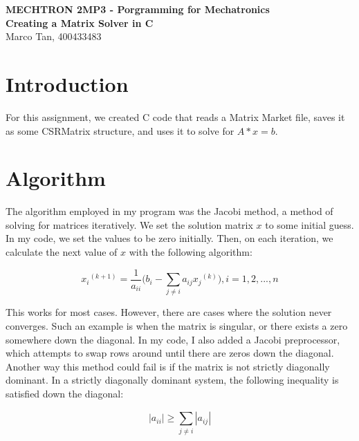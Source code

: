 \documentclass[12pt]{article}
\begin{document}
	
	\justifying
	
	\begin{center}
		\textbf{{\large MECHTRON 2MP3 - Porgramming for Mechatronics}} \\
		\textbf{Creating a Matrix Solver in C} \\
		Marco Tan, 400433483
	\end{center}
	
	\section{Introduction}
    For this assignment, we created C code that reads a Matrix Market file, saves it as some CSRMatrix structure, and uses it to solve for $A*x=b$.

    \section{Algorithm}
    The algorithm employed in my program was the Jacobi method, a method of solving for matrices iteratively. We set the solution matrix $x$ to some initial guess. In my code, we set the values to be zero initially. Then, on each iteration, we calculate the next value of $x$ with the following algorithm:

    \[
     {x_{i}}^{(k+1)} =  \frac{1}{a_{ii}} \big(b_{i} -  \sum_{j\neq i}^{}{a_{ij}{x_{j}}^{(k)}} \big), i=1,2,...,n
    \]

    This works for most cases. However, there are cases where the solution never converges. Such an example is when the matrix is singular, or there exists a zero somewhere down the diagonal. In my code, I also added a Jacobi preprocessor, which attempts to swap rows around until there are zeros down the diagonal. \\

    Another way this method could fail is if the matrix is not strictly diagonally dominant. In a strictly diagonally dominant system, the following inequality is satisfied down the diagonal:

    \[
    |a_{ii}|  \geq  \sum_{j\neq i}^{}|a_{ij}| 
    \]

    \newpage
\end{document}
